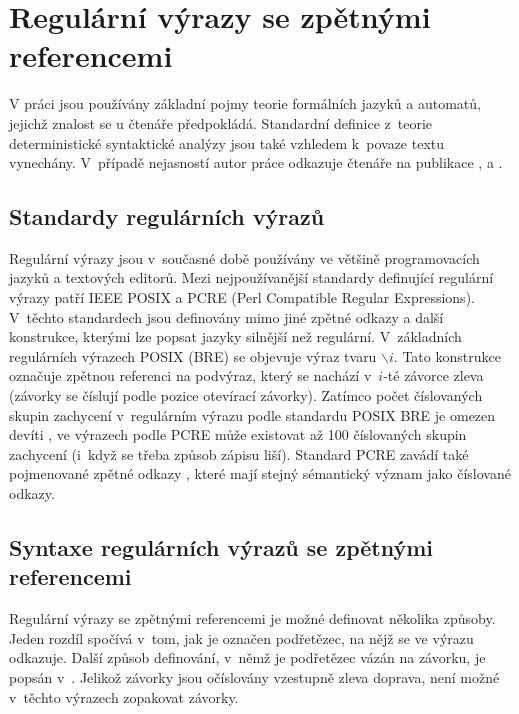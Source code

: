\documentclass[thesis=B,czech]{FITthesis}[2019/12/23]
\theoremstyle{definition}
\begin{document}
\chapter{Regulární výrazy se zpětnými referencemi}

V práci jsou používány základní pojmy teorie formálních jazyků a automatů, jejichž znalost se u čtenáře předpokládá. Standardní definice z~teorie deterministické syntaktické analýzy jsou také vzhledem k~povaze textu vynechány. V~případě nejasností autor práce odkazuje čtenáře na publikace \cite{hopcroft}, \cite{sestakova} a \cite{aho_lam_sethi_ullman_2007}.
\section{Standardy regulárních výrazů}
Regulární výrazy jsou v~současné době používány ve většině programovacích jazyků a textových editorů. Mezi nejpoužívanější standardy definující regulární výrazy patří IEEE POSIX a PCRE (Perl Compatible Regular Expressions). V~těchto standardech jsou definovány mimo jiné zpětné odkazy a další konstrukce, kterými lze popsat jazyky silnější než regulární. V~základních regulárních výrazech POSIX (BRE) se objevuje výraz tvaru $\backslash i$. Tato konstrukce označuje zpětnou referenci na podvýraz, který se nachází v~$i$-té závorce zleva (závorky se číslují podle pozice otevírací závorky). Zatímco počet číslovaných skupin zachycení v~regulárním výrazu podle standardu POSIX BRE je omezen devíti \cite[s. 233]{posix}, ve výrazech podle PCRE může existovat až 100 číslovaných skupin zachycení (i~když se třeba způsob zápisu liší). Standard PCRE zavádí také pojmenované zpětné odkazy \cite{pcre}, které mají stejný sémantický význam jako číslované odkazy.
\section{Syntaxe regulárních výrazů se zpětnými referencemi}

Regulární výrazy se zpětnými referencemi je možné definovat několika způsoby. Jeden rozdíl spočívá v~tom, jak je označen podřetězec, na nějž se ve výrazu odkazuje. Další způsob definování, v~němž je podřetězec vázán na závorku, je popsán v~\cite{campeanu}. Jelikož závorky jsou očíslovány vzestupně zleva doprava, není možné v~těchto výrazech zopakovat  závorky.
\end{document}
